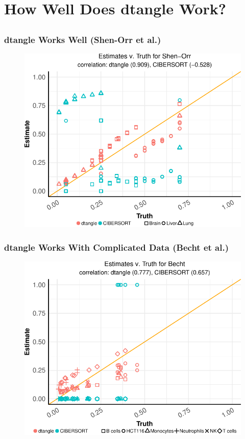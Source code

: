 \documentclass[usenames,dvipsnames,15pt,handout]{beamer}
\begin{document}
\setcounter{subsection}{0}
\section{How Well Does dtangle Work?}
\subsection{}

\begin{frame}
  \frametitle{dtangle Works Well (Shen-Orr et al.)}
  \begin{figure}
   \hspace*{-1cm}
  \includegraphics[scale=.75]{pictures/Shen-Orr_scatter.pdf}
  \end{figure}
\end{frame}


\begin{frame}
  \frametitle{dtangle Works With Complicated Data (Becht et al.)}
  \begin{figure}
   \hspace*{-1cm}
  \includegraphics[scale=.75]{pictures/Becht_scatter.pdf}
  \end{figure}
\end{frame}
\end{document}
